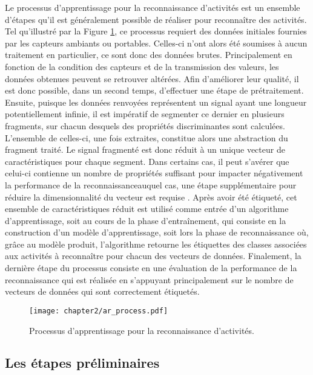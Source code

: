Le processus d'apprentissage pour la reconnaissance d'activités est un ensemble d'étapes qu'il est généralement possible de réaliser pour reconnaître des activités. Tel qu'illustré par la Figure \ref{fig:ar_process}, ce processus requiert des données initiales fournies par les capteurs ambiants ou portables. Celles-ci n'ont alors été soumises à aucun traitement en particulier, ce sont donc des données brutes. Principalement en fonction de la condition des capteurs et de la transmission des valeurs, les données obtenues peuvent se retrouver altérées. Afin d'améliorer leur qualité, il est donc possible, dans un second temps, d'effectuer une étape de prétraitement. Ensuite, puisque les données renvoyées représentent un signal ayant une longueur potentiellement infinie, il est impératif de segmenter ce dernier en plusieurs fragments, sur chacun desquels des propriétés discriminantes sont calculées. L'ensemble de celles-ci, une fois extraites, constitue alors une abstraction du fragment traité. Le signal fragmenté est donc réduit à un unique vecteur de caractéristiques pour chaque segment. Dans certains cas, il peut s'avérer que celui-ci contienne un nombre de propriétés suffisant pour impacter négativement la performance de la reconnaissance\textemdash auquel cas, une étape supplémentaire pour réduire la dimensionnalité du vecteur est requise \citep{George2012}. Après avoir été étiqueté, cet ensemble de caractéristiques réduit est utilisé comme entrée d'un algorithme d'apprentissage, soit au cours de la phase d'entraînement, qui consiste en la construction d'un modèle d'apprentissage, soit lors la phase de reconnaissance où, grâce au modèle produit, l'algorithme retourne les étiquettes des classes associées aux activités à reconnaître pour chacun des vecteurs de données. Finalement, la dernière étape du processus consiste en une évaluation de la performance de la reconnaissance qui est réalisée en s'appuyant principalement sur le nombre de vecteurs de données qui sont correctement étiquetés.

\begin{figure}[H]
	\centering
	\texttt{[image: chapter2/ar\_process.pdf]}
	\caption{Processus d'apprentissage pour la reconnaissance d'activités.}
	\label{fig:ar_process}
\end{figure}

\subsection{Les étapes préliminaires}
\label{sec:prel_steps}

